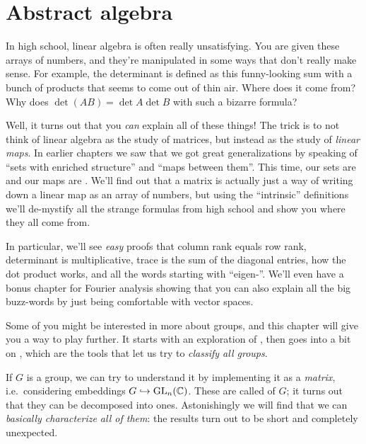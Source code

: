 \section{Abstract algebra}
\begin{itemize}
In high school, linear algebra is often really unsatisfying.
You are given these arrays of numbers,
and they're manipulated in some ways that don't really make sense.
For example, the determinant is defined as this
funny-looking sum with a bunch of products that seems
to come out of thin air. Where does it come from?
Why does $\det(AB) = \det A \det B$ with such a bizarre formula?

Well, it turns out that you \emph{can} explain all of these things!
The trick is to not think of linear algebra
as the study of matrices,
but instead as the study of \emph{linear maps}.
In earlier chapters we saw that we got great generalizations
by speaking of ``sets with enriched structure'' and ``maps between them''.
This time, our sets are 
and our maps are .
We'll find out that a matrix is actually just
a way of writing down a linear map as an array of numbers,
but using the ``intrinsic'' definitions
we'll de-mystify all the strange formulas from high school
and show you where they all come from.

In particular, we'll see \emph{easy} proofs
that column rank equals row rank,
determinant is multiplicative, trace is the sum of the diagonal entries,
how the dot product works,
and all the words starting with ``eigen-''.
We'll even have a bonus chapter for Fourier analysis
showing that you can also explain all the big buzz-words
by just being comfortable with vector spaces.

Some of you might be interested in more about groups,
and this chapter will give you a way to play further.
It starts with an exploration of ,
then goes into a bit on ,
which are the tools that let us try to \emph{classify all groups}.

If $G$ is a group, we can try to understand
it by implementing it as a \emph{matrix},
i.e.\ considering embeddings $G \hookrightarrow \operatorname{GL}_n(\mathbb C)$.
These are called  of $G$;
it turns out that they can be decomposed into  ones.
Astonishingly we will find that we can
\emph{basically characterize all of them}:
the results turn out to be short and completely unexpected.


\end{itemize}
